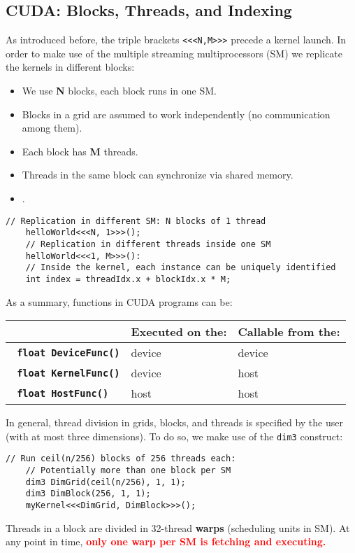 \subsection{CUDA: Blocks, Threads, and Indexing}
As introduced before, the triple brackets \texttt{<<<N,M>>>} precede a kernel launch.
In order to make use of the multiple streaming multiprocessors (SM) we replicate the kernels in different blocks:
\begin{itemize}
    \item We use \textbf{N} blocks, each block runs in one SM.
    \item Blocks in a grid are assumed to work independently (no communication among them).
    \item Each block has \textbf{M} threads.
    \item Threads in the same block can synchronize via shared memory.
    \item \textbf{\color{red}{CUDA only allows for synchronization among threads in the same block.}}.
\end{itemize}
\begin{lstlisting}[style=cuda,caption={Example of a kernel definition and call.}]
    // Replication in different SM: N blocks of 1 thread
    helloWorld<<<N, 1>>>();
    // Replication in different threads inside one SM
    helloWorld<<<1, M>>>():
    // Inside the kernel, each instance can be uniquely identified
    int index = threadIdx.x + blockIdx.x * M;
\end{lstlisting}
As a summary, functions in CUDA programs can be:
\begin{table}[h!]
    \centering
    \begin{tabular}{p{} p{} p{}}
        \hline
        & \textbf{Executed on the:} & \textbf{Callable from the:} \\[3pt] \hline \hline
        \textbf{\texttt{\color{blue}{\_\_device\_\_} \color{black}float DeviceFunc()}} & device & device \\[3pt]
        \textbf{\texttt{\color{blue}{\_\_global\_\_} \color{black}float KernelFunc()}} & device & host \\[3pt]
        \textbf{\texttt{\color{blue}{\_\_host\_\_} \color{black}float HostFunc()}} & host & host \\[3pt] \hline \hline
    \end{tabular}
\end{table}
In general, thread division in grids, blocks, and threads is specified by the user (with at most three dimensions).
To do so, we make use of the \texttt{dim3} construct:
\begin{lstlisting}[style=cuda,caption={Example of a kernel definition and call.}]
    // Run ceil(n/256) blocks of 256 threads each:
    // Potentially more than one block per SM
    dim3 DimGrid(ceil(n/256), 1, 1);
    dim3 DimBlock(256, 1, 1);
    myKernel<<<DimGrid, DimBlock>>>();
\end{lstlisting}
Threads in a block are divided in 32-thread \textbf{warps} (scheduling units in SM).
At any point in time, \textbf{\textcolor{red}{only one warp per SM is fetching and executing.}}

